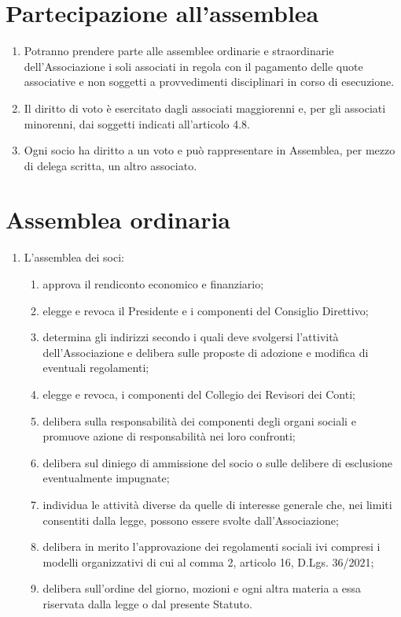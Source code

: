 \documentclass{djtsasddoc}
\begin{document}
	\section{Partecipazione all'assemblea}
	\begin{enumerate}
		\item Potranno prendere parte alle assemblee ordinarie e straordinarie dell'Associazione i soli associati in regola con il pagamento delle quote associative e non soggetti a provvedimenti disciplinari in corso di esecuzione.
		\item Il diritto di voto è esercitato dagli associati maggiorenni e, per gli associati minorenni, dai soggetti indicati all'articolo 4.8.
		\item Ogni socio ha diritto a un voto e può rappresentare in Assemblea, per mezzo di delega scritta, un altro associato.
	\end{enumerate}

	\section{Assemblea ordinaria}
	\begin{enumerate}
		\item L'assemblea dei soci:
		\begin{enumerate}
			\item approva il rendiconto economico e finanziario;
			\item elegge  e revoca il Presidente e i componenti del Consiglio Direttivo;
			\item determina gli indirizzi secondo i quali deve svolgersi l'attività dell'Associazione e delibera sulle proposte di adozione e modifica di eventuali regolamenti;
			\item elegge e revoca, i componenti  del Collegio dei Revisori dei Conti;
			\item delibera sulla responsabilità dei componenti degli organi sociali e promuove azione di responsabilità nei loro confronti;
			\item delibera sul diniego di ammissione del socio o sulle delibere di esclusione eventualmente impugnate;
			\item individua le attività diverse da quelle di interesse generale che, nei limiti consentiti dalla legge, possono essere svolte dall'Associazione;
			\item delibera in merito l'approvazione dei regolamenti sociali ivi compresi i modelli organizzativi di cui al comma 2, articolo 16, D.Lgs. 36/2021;
			\item delibera sull'ordine del giorno, mozioni e ogni altra materia a essa riservata dalla legge o dal presente Statuto.
		\end{enumerate}
	\end{enumerate}
	
\end{document}

